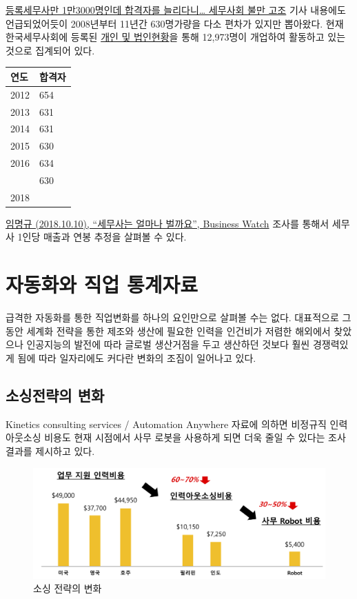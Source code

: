 \documentclass[smallextended]{svjour3}       %
\begin{document}
\href{http://biz.newdaily.co.kr/site/data/html/2019/01/22/2019012200053.html}{등록세무사만
1만3000명인데 합격자를 늘리다니\ldots{} 세무사회 불만 고조} 기사
내용에도 언급되었어듯이 2008년부터 11년간 630명가량을 다소 편차가 있지만
뽑아왔다. 현재 한국세무사회에 등록된
\href{http://www.kacpta.or.kr/}{개인 및 법인현황}을 통해 12,973명이
개업하여 활동하고 있는 것으로 집계되어 있다.

\begin{tabular}{ll}
\toprule
연도 & 합격자\\
\midrule
2012 & 654\\
2013 & 631\\
2014 & 631\\
2015 & 630\\
2016 & 634\\
\addlinespace
2017 & 630\\
2018 & \\
\bottomrule
\end{tabular}

\href{http://news.bizwatch.co.kr/article/tax/2018/10/05/0010}{임명규
(2018.10.10), ``세무사는 얼마나 벌까요'', Business Watch} 조사를 통해서
세무사 1인당 매출과 연봉 추정을 살펴볼 수 있다.

\hypertarget{automation-job-statistics}{%
\section{자동화와 직업 통계자료}\label{automation-job-statistics}}

급격한 자동화를 통한 직업변화를 하나의 요인만으로 살펴볼 수는 없다.
대표적으로 그동안 세계화 전략을 통한 제조와 생산에 필요한 인력을
인건비가 저렴한 해외에서 찾았으나 인공지능의 발전에 따라 글로벌
생산거점을 두고 생산하던 것보다 훨씬 경쟁력있게 됨에 따라 일자리에도
커다란 변화의 조짐이 일어나고 있다.

\hypertarget{strategy-change}{%
\subsection{소싱전략의 변화}\label{strategy-change}}

Kinetics consulting services / Automation Anywhere 자료에 의하면
비정규직 인력아웃소싱 비용도 현재 시점에서 사무 로봇을 사용하게 되면
더욱 줄일 수 있다는 조사결과를 제시하고 있다.

\begin{figure}

{\centering \includegraphics[width=1\linewidth]{fig/the-end-of-outsourcing} 

}

\caption{소싱 전략의 변화}\label{fig:unnamed-chunk-2}
\end{figure}
\end{document}
